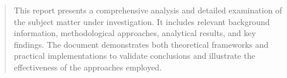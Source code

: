 \titleformat{\section}{\large\bfseries\sffamily\raggedright}{\thesection}{1em}{}
\titleformat{\subsection}{\large\bfseries\sffamily\raggedright}{\thesubsection}{1em}{}
\titleformat{\subsubsection}{\normalsize\bfseries\sffamily\raggedright}{\thesubsubsection}{1em}{}














\begin{abstract}
    \noindent
    This report presents a comprehensive analysis and detailed examination of the subject matter under investigation. It includes relevant background information, methodological approaches, analytical results, and key findings. The document demonstrates both theoretical frameworks and practical implementations to validate conclusions and illustrate the effectiveness of the approaches employed.
\end{abstract}
\newpage

\renewcommand{\baselinestretch}{1}\normalsize
\tableofcontents
\renewcommand{\baselinestretch}{1}\normalsize
\thispagestyle{fancy}
\newpage


\listoffigures
\thispagestyle{fancy}

